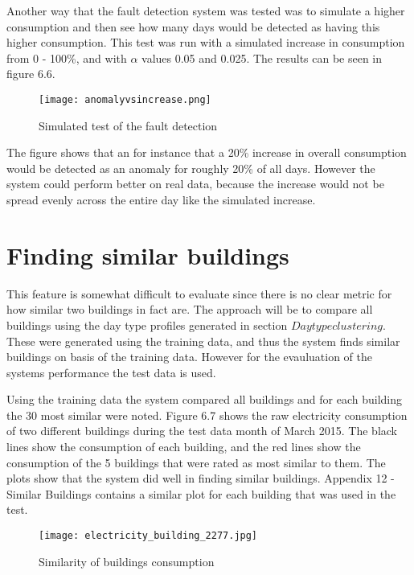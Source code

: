 Another way that the fault detection system was tested was to simulate a higher consumption and then see how many days would be detected as having this higher consumption. This test was run with a simulated increase in consumption from 0 - 100\%, and with $\alpha$ values 0.05 and 0.025. The results can be seen in figure 6.6.
\begin{figure}
\begin{center}
\texttt{[image: anomalyvsincrease.png]}
\end{center}
\caption{Simulated test of the fault detection}
\end{figure}
The figure shows that an for instance that a 20\% increase in overall consumption would be detected as an anomaly for roughly 20\% of all days. However the system could perform better on real data, because the increase would not be spread evenly across the entire day like the simulated increase.
\section*{Finding similar buildings}
This feature is somewhat difficult to evaluate since there is no clear metric for how similar two buildings in fact are. The approach will be to compare all buildings using the day type profiles generated in section $Daytype clustering$. These were generated using the training data, and thus the system finds similar buildings on basis of the training data. However for the evauluation of the systems performance the test data is used.

Using the training data the system compared all buildings and for each building the 30 most similar were noted. Figure 6.7 shows the raw electricity consumption of two different buildings during the test data month of March 2015. The black lines show the consumption of each building, and the red lines show the consumption of the 5 buildings that were rated as most similar to them. The plots show that the system did well in finding similar buildings. Appendix 12 -Similar Buildings contains a similar plot for each building that was used in the test.
\begin{figure}
\begin{center}
\texttt{[image: electricity\_building\_2277.jpg]}
\end{center}
\caption{Similarity of buildings consumption}
\end{figure}

